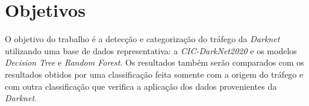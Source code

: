 \section{Objetivos}

O objetivo do trabalho é a detecção e categorização
do tráfego da \emph{Darknet} utilizando uma base de dados
representativa: a \emph{CIC-DarkNet2020} e os modelos 
\emph{Decision Tree} e \emph{Random Forest}. Os resultados 
também serão comparados com os resultados obtidos 
por uma classificação feita somente com a origem 
do tráfego e com outra classificação que verifica
a aplicação dos dados provenientes da \emph{Darknet}.
